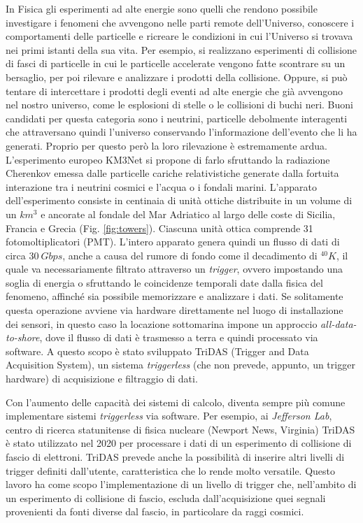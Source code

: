 \documentclass[../main.tex]{subfiles}
\begin{document}
In Fisica gli esperimenti ad alte energie sono quelli che rendono possibile investigare i fenomeni che avvengono nelle parti remote dell'Universo, conoscere i comportamenti delle particelle e ricreare le condizioni in cui l'Universo si trovava nei primi istanti della sua vita. Per esempio, si realizzano esperimenti di collisione di fasci di particelle in cui le particelle accelerate vengono fatte scontrare su un bersaglio, per poi rilevare e analizzare i prodotti della collisione. Oppure, si può tentare di intercettare i prodotti degli eventi ad alte energie che già avvengono nel nostro universo, come le esplosioni di stelle o le collisioni di buchi neri. Buoni candidati per questa categoria sono i neutrini, particelle debolmente interagenti che attraversano quindi l'universo conservando l'informazione dell'evento che li ha generati. Proprio per questo però la loro rilevazione è estremamente ardua. L'esperimento europeo KM3Net si propone di farlo sfruttando la radiazione Cherenkov emessa dalle particelle cariche relativistiche generate dalla fortuita interazione tra i neutrini cosmici e l'acqua o i fondali marini. L'apparato dell'esperimento consiste in centinaia di unità ottiche distribuite in un volume di un $km^3$ e ancorate al fondale del Mar Adriatico al largo delle coste di Sicilia, Francia e Grecia (Fig. \ref{fig:towers}). Ciascuna unità ottica comprende 31 fotomoltiplicatori (PMT). 
L'intero apparato genera quindi un flusso di dati di circa $30\ Gbps$, anche a causa del rumore di fondo come il decadimento di ${}^{40}K$, il quale va necessariamente filtrato attraverso un \emph{trigger}, ovvero impostando una soglia di energia o sfruttando le coincidenze temporali date dalla fisica del fenomeno, affinché sia possibile memorizzare e analizzare i dati. Se solitamente questa operazione avviene via hardware direttamente nel luogo di installazione dei sensori, in questo caso la locazione sottomarina impone un approccio \emph{all-data-to-shore}, dove il flusso di dati è trasmesso a terra e quindi processato via software. A questo scopo è stato sviluppato TriDAS (Trigger and Data Acquisition System), un sistema \emph{triggerless} (che non prevede, appunto, un trigger hardware) di acquisizione e filtraggio di dati.

Con l'aumento delle capacità dei sistemi di calcolo, diventa sempre più comune implementare sistemi \emph{triggerless} via software. Per esempio, ai \emph{Jefferson Lab}, centro di ricerca statunitense di fisica nucleare (Newport News, Virginia) TriDAS è stato utilizzato nel 2020 per processare i dati di un esperimento di collisione di fascio di elettroni. TriDAS prevede anche la possibilità di inserire altri livelli di trigger definiti dall'utente, caratteristica che lo rende molto versatile. Questo lavoro ha come scopo l'implementazione di un livello di trigger che, nell'ambito di un esperimento di collisione di fascio, escluda dall'acquisizione quei segnali provenienti da fonti diverse dal fascio, in particolare da raggi cosmici.
\end{document}
